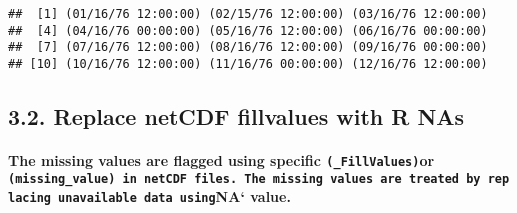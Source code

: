 \documentclass[]{article}
\newenvironment{Shaded}{\begin{snugshade}}{\end{snugshade}}
\newcommand{\KeywordTok}[1]{\textcolor[rgb]{0.13,0.29,0.53}{\textbf{#1}}}
\newcommand{\DataTypeTok}[1]{\textcolor[rgb]{0.13,0.29,0.53}{#1}}
\newcommand{\DecValTok}[1]{\textcolor[rgb]{0.00,0.00,0.81}{#1}}
\newcommand{\StringTok}[1]{\textcolor[rgb]{0.31,0.60,0.02}{#1}}
\newcommand{\CommentTok}[1]{\textcolor[rgb]{0.56,0.35,0.01}{\textit{#1}}}
\newcommand{\OperatorTok}[1]{\textcolor[rgb]{0.81,0.36,0.00}{\textbf{#1}}}
\newcommand{\NormalTok}[1]{#1}
\let\oldparagraph\paragraph
\renewcommand{\paragraph}[1]{\oldparagraph{#1}\mbox{}}
\begin{document}
\begin{Shaded}
\end{Shaded}

\begin{verbatim}
##  [1] (01/16/76 12:00:00) (02/15/76 12:00:00) (03/16/76 12:00:00)
##  [4] (04/16/76 00:00:00) (05/16/76 12:00:00) (06/16/76 00:00:00)
##  [7] (07/16/76 12:00:00) (08/16/76 12:00:00) (09/16/76 00:00:00)
## [10] (10/16/76 12:00:00) (11/16/76 00:00:00) (12/16/76 12:00:00)
\end{verbatim}

\subsection{3.2. Replace netCDF fillvalues with R
NAs}\label{replace-netcdf-fillvalues-with-r-nas}

\paragraph{\texorpdfstring{The missing values are flagged using specific
\texttt{(\_FillValues)}or
\texttt{(missing\_value)\ in\ netCDF\ files.\ The\ missing\ values\ are\ treated\ by\ replacing\ unavailable\ data\ using}NA`
value.}{The missing values are flagged using specific (\_FillValues)or (missing\_value) in netCDF files. The missing values are treated by replacing unavailable data usingNA` value.}}\label{the-missing-values-are-flagged-using-specific-_fillvaluesor-missing_value-in-netcdf-files.-the-missing-values-are-treated-by-replacing-unavailable-data-usingna-value.}
\end{document}
